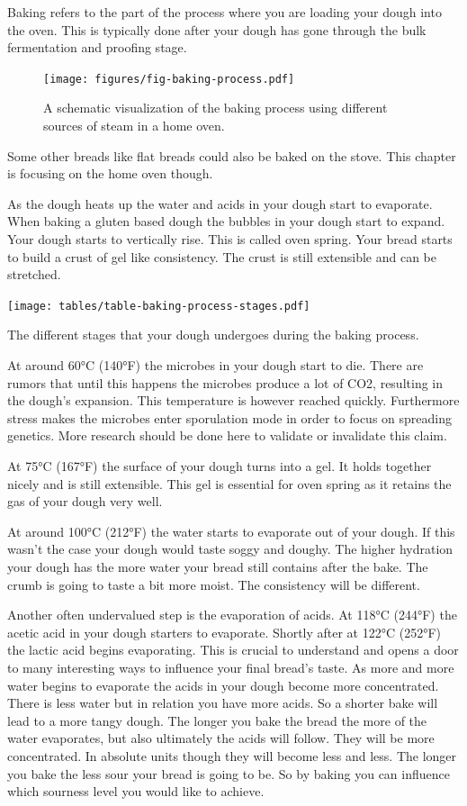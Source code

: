 Baking refers to the part of the process where you are loading
your dough into the oven. This is typically done after your
dough has gone through the bulk fermentation and proofing stage.

\begin{figure}[!htb]
  \texttt{[image: figures/fig-baking-process.pdf]}
  \caption{A schematic visualization of the baking process using different sources of steam in a home oven.}
  \label{fig:baking-process}
\end{figure}

Some other breads like flat breads
could also be baked on the stove. This chapter is focusing on the
home oven though.

As the dough heats up the water and acids
in your dough start to evaporate. When baking
a gluten based dough the bubbles in your dough start to expand.
Your dough starts to vertically rise. This is called oven spring.
Your bread starts to build a crust of gel like consistency. The crust is still
extensible and can be stretched.

\begin{table}[htp!]
  \texttt{[image: tables/table-baking-process-stages.pdf]}
  \caption{The different stages that your dough undergoes during the baking process.}
\end{table}

At around 60°C (140°F) the microbes in your dough start to die.
There are rumors that until this happens the microbes produce
a lot of CO2, resulting in the dough's expansion. This temperature
is however reached quickly. Furthermore stress makes the microbes
enter sporulation mode in order to focus on spreading genetics.
More research should be done here to validate or invalidate this
claim.

At 75°C (167°F) the surface of your dough turns into a gel. It
holds together nicely and is still extensible. This gel is essential
for oven spring as it retains the gas of your dough very well.

At around 100°C (212°F) the water starts to evaporate out of your
dough. If this wasn't the case your dough would taste soggy and
doughy. The higher hydration your dough has the more water your bread
still contains after the bake. The crumb is going to taste a bit
more moist. The consistency will be different.

Another often undervalued step is the evaporation of acids. At
118°C (244°F) the acetic acid in your dough starters to evaporate.
Shortly after at 122°C (252°F) the lactic acid begins evaporating.
This is crucial to understand and opens a door to many interesting
ways to influence your final bread's taste. As more and more water
begins to evaporate the acids in your dough become more concentrated.
There is less water but in relation you have more acids. So a shorter
bake will lead to a more tangy dough. The longer you bake the bread
the more of the water evaporates, but also ultimately the acids will follow.
They will be more concentrated. In absolute units though they
will become less and less. The longer you bake the less sour
your bread is going to be. So by baking you can
influence which sourness level you would like to achieve.

